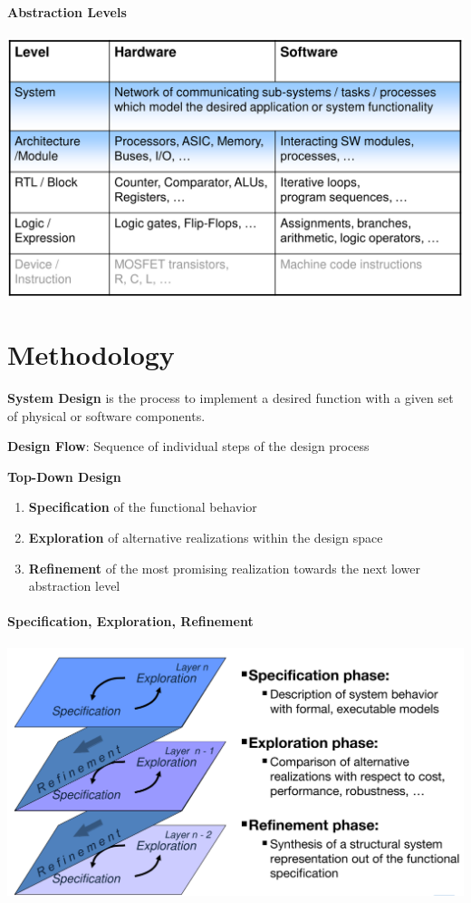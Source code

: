 \documentclass[english]{latex4ei/latex4ei_sheet}
\begin{document}
\paragraph{Abstraction Levels}

\begin{center}
  \includegraphics[width=0.8\linewidth]{assets/AbstractionLevels.png}
\end{center}


\section{Methodology}

\textbf{System Design} is the process to implement a desired function with a given set of physical or software components.

\textbf{Design Flow}: Sequence of individual steps of the design process

\textbf{Top-Down Design}
\begin{enumerate}
		\item \textbf{Specification} of the functional behavior
		\item \textbf{Exploration} of alternative realizations within the design space
		\item \textbf{Refinement} of the most promising realization towards the next lower abstraction level
\end{enumerate}

\paragraph{Specification, Exploration, Refinement}

\begin{center}
  \includegraphics[width=0.8\linewidth]{assets/SpecExRef.png}
\end{center}
\end{document}
